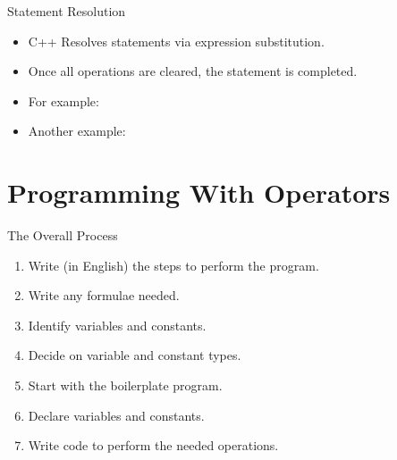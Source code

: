 \documentclass[]{beamer}
\begin{document}
\begin{frame}{Statement Resolution}
    \begin{itemize}[<+->]
        \item C++ Resolves statements via expression substitution.
        \item Once all operations are cleared, the statement is
            completed.
        \item For example:
        \item Another example:
    \end{itemize}
\end{frame}

\section{Programming With Operators}

\begin{frame}{The Overall Process}
    \begin{enumerate}[<+->]
        \item Write (in English) the steps to perform the program.
        \item Write any formulae needed.
        \item Identify variables and constants.
        \item Decide on variable and constant types.
        \item Start with the boilerplate program.
        \item Declare variables and constants.
        \item Write code to perform the needed operations.
    \end{enumerate}
\end{frame}
\end{document}
